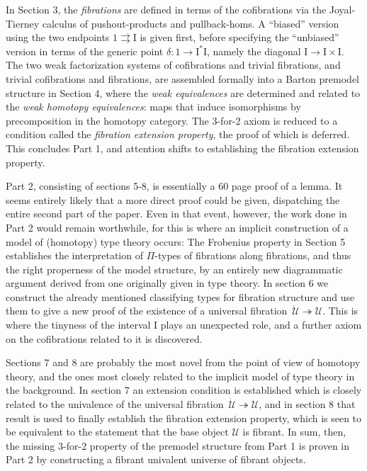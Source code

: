 \documentclass[11pt]{amsart}
\newcommand{\fib}{\ensuremath{\twoheadrightarrow}}
\renewcommand{\to}{\ensuremath{\rightarrow}}
\newcommand{\I}{\ensuremath{\mathrm{I}}}
\newcommand{\U}{\ensuremath{\mathcal{U}}}
\newcommand{\UU}{\ensuremath{\,\dot{\mathcal{U}}}}
\theoremstyle{remark}
\theoremstyle{definition}
\begin{document}
In Section 3, the \emph{fibrations} are defined in terms of the cofibrations via the Joyal-Tierney calculus of pushout-products and pullback-homs.  A ``biased'' version using the two endpoints $1\rightrightarrows\I$ is given first, before specifying the ``unbiased''  version in terms of the generic point $\delta : 1 \to \I^*\I$, namely the diagonal $\I \to \I\times\I$.  The two weak factorization systems of cofibrations and trivial fibrations, and trivial cofibrations and fibrations, are assembled formally into a Barton premodel structure in Section 4, where the \emph{weak equivalences} are determined and related to the \emph{weak homotopy equivalences}:  maps that induce isomorphisms by precomposition in the homotopy category.  The 3-for-2 axiom is reduced to a condition called the \emph{fibration extension property}, the proof of which is deferred.  This concludes Part 1, and attention shifts to establishing the fibration extension property.

Part 2, consisting of sections 5-8, is essentially a 60 page proof of a lemma.  It seems entirely likely that a more direct proof could be given, dispatching the entire second part of the paper. Even in that event, however, the work done in Part 2 would remain worthwhile, for this is where an implicit construction of a model of (homotopy) type theory occurs: The Frobenius property in Section 5 establishes the interpretation of $\Pi$-types of fibrations along fibrations, and thus the right properness of the model structure, by an entirely new diagrammatic argument derived from one originally given in type theory.   In section 6 we construct the already mentioned classifying types  for fibration structure and use them to give a new proof of the existence of a universal fibration $\UU\fib\U$.  This is where the tinyness of the interval $\I$ plays an unexpected role, and a further axiom on the cofibrations related to it is discovered.

Sections 7 and 8 are probably the most novel from the point of view of homotopy theory, and the ones most closely related to the implicit model of type theory in the background.  In section 7 an extension condition is established which is closely related to the univalence of the universal fibration $\UU\fib\U$, and in section 8 that result is used to finally establish the fibration extension property, which is seen to be equivalent to the statement that the base object $\U$ is fibrant.  In sum, then, the missing 3-for-2 property of the premodel structure from Part 1 is proven in Part 2 by constructing a fibrant univalent universe of fibrant objects.
\end{document}
